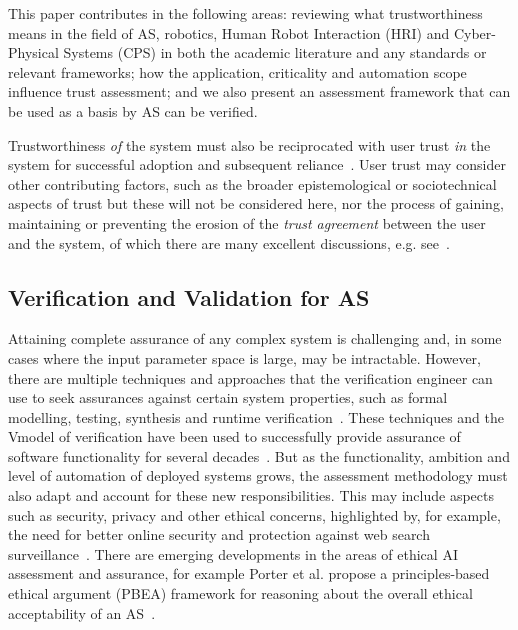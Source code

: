 This paper contributes in the following areas: reviewing what trustworthiness means in the field of AS, robotics, Human Robot Interaction (HRI) and Cyber-Physical Systems (CPS) in both the academic literature and any standards or relevant frameworks; how the application, criticality and automation scope influence trust assessment; and we also present an assessment framework that can be used as a basis by AS can be verified. 

Trustworthiness \emph{of} the system must also be reciprocated with user trust \emph{in} the system for successful adoption and subsequent reliance~\cite{Lee2004}. User trust may consider other contributing factors, such as the broader epistemological or sociotechnical aspects of trust but these will not be considered here, nor the process of gaining, maintaining or preventing the erosion of the \emph{trust agreement} between the user and the system, of which there are many excellent discussions, e.g. see~\cite{Kohn2021,Lee2004,kok2020trust,Chiou2021,Floridi2018}. 
%



\subsection{Verification and Validation for AS} \label{sec:intro-vav}

Attaining complete assurance of any complex system is challenging and, in some cases where the input parameter space is large, may be intractable. 
%
However, there are multiple techniques and approaches that the verification engineer can use to seek assurances against certain system properties, such as formal modelling, testing, synthesis and runtime verification~\cite{kress2021formalizing}. 
%
These techniques and the V\-model of verification have been used to successfully provide assurance of software functionality for several decades~\cite{Fewster1999}. 
%
But as the functionality, ambition and level of automation of deployed systems grows, the assessment methodology must also adapt and account for these new responsibilities. This may include aspects such as security, privacy and other ethical concerns, highlighted by, for example, the need for better online security and protection against web search surveillance~\cite{trackmenot2009}. 
%
There are emerging developments in the areas of ethical AI assessment and assurance, for example Porter et al. propose a principles-based ethical argument (PBEA) framework for reasoning about the overall ethical acceptability of an AS~\cite{Porter2022}. 


